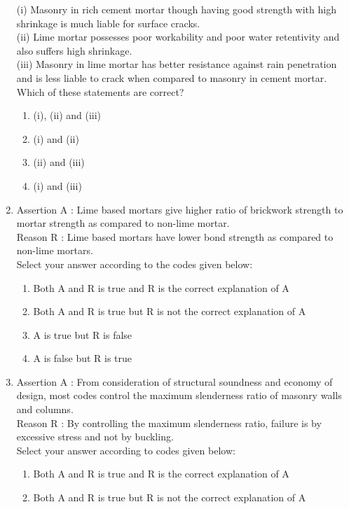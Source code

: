 \documentclass[11pt,a4paper]{article}
\begin{document}
\begin{enumerate}
{(i) Masonry in rich cement mortar though having good strength with high shrinkage is much liable for surface cracks. \\

(ii) Lime mortar possesses poor workability and poor water retentivity and also suffers high shrinkage. \\

(iii) Masonry in lime mortar has better resistance against rain penetration and is less liable to crack when compared to masonry in cement mortar. \\

Which of these statements are correct?
}
\begin{enumerate}[label=\Alph*.]
\item{(i), (ii) and (iii)}
\item{(i) and (ii)}
\item{(ii) and (iii)}
\item{(i) and (iii)}
\end{enumerate}
\item{Assertion A : Lime based mortars give higher ratio of brickwork strength to mortar strength as compared to non-lime mortar. \\
Reason R : Lime based mortars have lower bond strength as compared to non-lime mortars. \\
Select your answer according to the codes given below:}
\begin{enumerate}[label=\Alph*.]
\item{Both A and R is true and R is the correct explanation of A}
\item{Both A and R is true but R is not the correct explanation of A}
\item{A is true but R is false}
\item{A is false but R is true}
\end{enumerate}
\item{Assertion A : From consideration of structural soundness and economy of design, most codes control the maximum slenderness ratio of masonry walls and columns. \\
Reason R : By controlling the maximum slenderness ratio, failure is by excessive stress and not by buckling.  \\
Select your answer according to codes given below:}
\begin{enumerate}[label=\Alph*.]
\item{Both A and R is true and R is the correct explanation of A}
\item{Both A and R is true but R is not the correct explanation of A}

\end{enumerate}
\end{enumerate}
\end{document}
